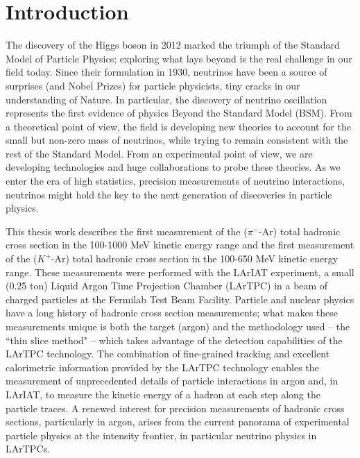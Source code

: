 \chapter{Introduction}\label{ch:-1}
The discovery of the Higgs boson in 2012 marked the triumph of the Standard Model of Particle Physics; exploring what lays beyond is the real challenge in our field today. 
Since their formulation in 1930, neutrinos have been a source of surprises (and Nobel Prizes) for particle physicists, tiny cracks in our understanding of Nature. In particular, the discovery of neutrino oscillation represents the first evidence of physics Beyond the Standard Model (BSM).  From a theoretical point of view, the field is developing new theories to account for the small but non-zero mass of neutrinos, while trying to remain consistent with the rest of the Standard Model.  From an experimental point of view, we are developing technologies and huge collaborations to probe these theories. As we enter the era of high statistics, precision measurements of neutrino interactions, neutrinos might hold the key to the next generation of discoveries in particle physics.


This thesis work describes the first measurement of the  ($\pi^-$-Ar)  total hadronic cross section  in the 100-1000 MeV  kinetic energy range and the first measurement of the ($K^+$-Ar) total hadronic cross section  in the 100-650 MeV  kinetic energy range. These measurements were performed with the LArIAT experiment,  a small (0.25 ton)  Liquid Argon Time Projection Chamber (LArTPC) in a beam of charged particles at the Fermilab Test Beam Facility.   Particle and nuclear physics have a long history of hadronic cross section measurements; what makes these measurements unique is both the target (argon) and the methodology used -- the ``thin slice method" -- which takes advantage of the detection capabilities of the LArTPC technology. The combination of fine-grained tracking and excellent calorimetric information provided by the LArTPC technology  enables the measurement of unprecedented details of particle interactions in argon and, in LArIAT, to measure the kinetic energy of a hadron at each step along the particle traces. A renewed interest for precision measurements of hadronic cross sections, particularly in argon, arises from the current  panorama of experimental  particle physics at the intensity frontier, in particular neutrino physics in LArTPCs.


